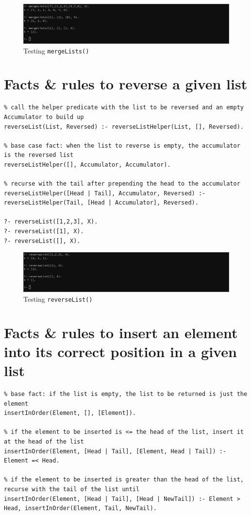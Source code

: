 \documentclass[a4paper]{article}
\begin{document}
\begin{figure}[H]
    \includegraphics[width=\textwidth]{./images/q4.png}
    \caption{Testing \texttt{mergeLists()}}
\end{figure}

\section{Facts \& rules to reverse a given list}
\begin{verbatim}
% call the helper predicate with the list to be reversed and an empty Accumulator to build up
reverseList(List, Reversed) :- reverseListHelper(List, [], Reversed).

% base case fact: when the list to reverse is empty, the accumulator is the reversed list
reverseListHelper([], Accumulator, Accumulator).

% recurse with the tail after prepending the head to the accumulator
reverseListHelper([Head | Tail], Accumulator, Reversed) :- reverseListHelper(Tail, [Head | Accumulator], Reversed).

?- reverseList([1,2,3], X).  
?- reverseList([1], X).  
?- reverseList([], X).  
\end{verbatim}

\begin{figure}[H]
    \includegraphics[width=\textwidth]{./images/q5.png}
    \caption{Testing \texttt{reverseList()}}
\end{figure}

\section{Facts \& rules to insert an element into its correct position in a given list}
\begin{verbatim}
% base fact: if the list is empty, the list to be returned is just the element
insertInOrder(Element, [], [Element]).

% if the element to be inserted is <= the head of the list, insert it at the head of the list
insertInOrder(Element, [Head | Tail], [Element, Head | Tail]) :- Element =< Head.

% if the element to be inserted is greater than the head of the list, recurse with the tail of the list until 
insertInOrder(Element, [Head | Tail], [Head | NewTail]) :- Element > Head, insertInOrder(Element, Tail, NewTail).
\end{verbatim}
\end{document}
